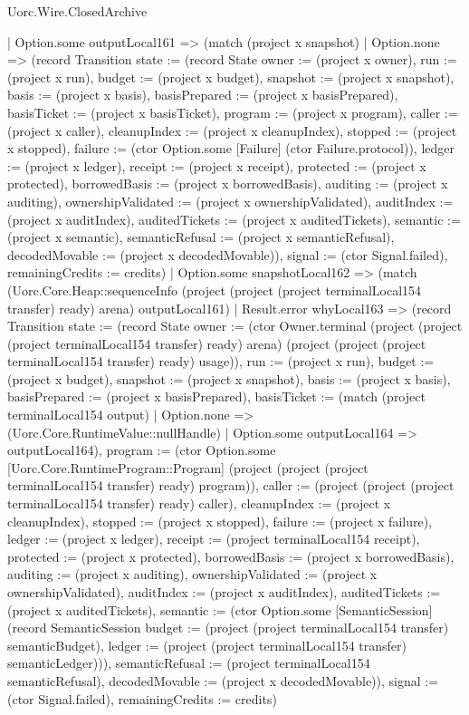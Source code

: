 \begin{lexlean}{Uorc.Wire.ClosedArchive}
\begin{semanticmodule}
{            | Option.some outputLocal161 => (match (project x snapshot)
              | Option.none => (record Transition {state := (record State {owner := (project x owner), run := (project x run), budget := (project x budget), snapshot := (project x snapshot), basis := (project x basis), basisPrepared := (project x basisPrepared), basisTicket := (project x basisTicket), program := (project x program), caller := (project x caller), cleanupIndex := (project x cleanupIndex), stopped := (project x stopped), failure := (ctor Option.some [Failure] (ctor Failure.protocol)), ledger := (project x ledger), receipt := (project x receipt), protected := (project x protected), borrowedBasis := (project x borrowedBasis), auditing := (project x auditing), ownershipValidated := (project x ownershipValidated), auditIndex := (project x auditIndex), auditedTickets := (project x auditedTickets), semantic := (project x semantic), semanticRefusal := (project x semanticRefusal), decodedMovable := (project x decodedMovable)}), signal := (ctor Signal.failed), remainingCredits := credits})
              | Option.some snapshotLocal162 => (match (Uorc.Core.Heap::sequenceInfo (project (project (project terminalLocal154 transfer) ready) arena) outputLocal161)
                | Result.error whyLocal163 => (record Transition {state := (record State {owner := (ctor Owner.terminal (project (project (project terminalLocal154 transfer) ready) arena) (project (project (project terminalLocal154 transfer) ready) usage)), run := (project x run), budget := (project x budget), snapshot := (project x snapshot), basis := (project x basis), basisPrepared := (project x basisPrepared), basisTicket := (match (project terminalLocal154 output)
                  | Option.none => (Uorc.Core.RuntimeValue::nullHandle)
                  | Option.some outputLocal164 => outputLocal164), program := (ctor Option.some [Uorc.Core.RuntimeProgram::Program] (project (project (project terminalLocal154 transfer) ready) program)), caller := (project (project (project terminalLocal154 transfer) ready) caller), cleanupIndex := (project x cleanupIndex), stopped := (project x stopped), failure := (project x failure), ledger := (project x ledger), receipt := (project terminalLocal154 receipt), protected := (project x protected), borrowedBasis := (project x borrowedBasis), auditing := (project x auditing), ownershipValidated := (project x ownershipValidated), auditIndex := (project x auditIndex), auditedTickets := (project x auditedTickets), semantic := (ctor Option.some [SemanticSession] (record SemanticSession {budget := (project (project terminalLocal154 transfer) semanticBudget), ledger := (project (project terminalLocal154 transfer) semanticLedger)})), semanticRefusal := (project terminalLocal154 semanticRefusal), decodedMovable := (project x decodedMovable)}), signal := (ctor Signal.failed), remainingCredits := credits})
}
\end{semanticmodule}
\end{lexlean}
